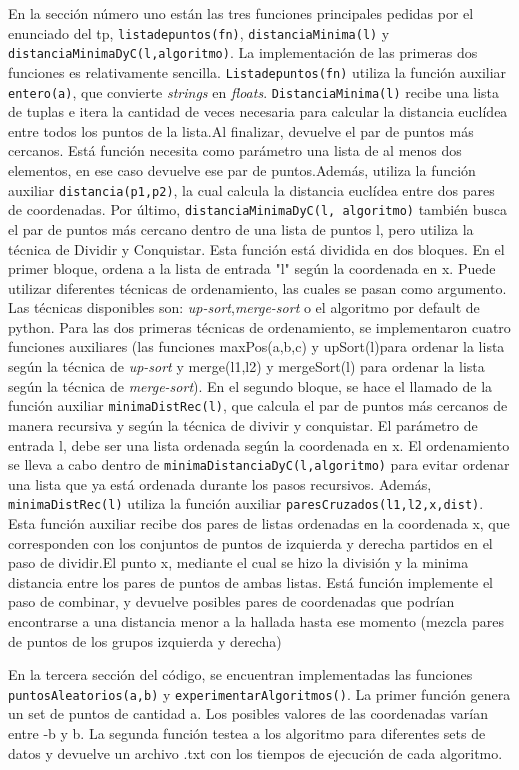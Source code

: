 \documentclass[12pt,a4paper]{article}
\begin{document}
En la sección número uno están las tres funciones principales pedidas por el enunciado del tp, \texttt{listadepuntos(fn)}, \texttt{distanciaMinima(l)} y \\\texttt{distanciaMinimaDyC(l,algoritmo)}. La implementación de las primeras dos funciones es relativamente sencilla. \texttt{Listadepuntos(fn)} utiliza la función auxiliar \texttt{entero(a)}, que convierte \textit{strings} en \textit{floats}. \texttt{DistanciaMinima(l)} recibe una lista de tuplas e itera la cantidad de veces necesaria para calcular la distancia euclídea entre todos los puntos de la lista.Al finalizar, devuelve el par de puntos más cercanos. Está función necesita como parámetro una lista de al menos dos elementos, en ese caso devuelve ese par de puntos.Además, utiliza la función auxiliar \texttt{distancia(p1,p2)}, la cual calcula la distancia euclídea entre dos pares de coordenadas. Por último, \texttt{distanciaMinimaDyC(l, algoritmo)} también busca el par de puntos más cercano dentro de una lista de puntos l, pero utiliza la técnica de Dividir y Conquistar. Esta función está dividida en dos bloques. En el primer bloque, ordena a la lista de entrada "l" según la coordenada en x. Puede utilizar diferentes técnicas de ordenamiento, las cuales se pasan como argumento. Las técnicas disponibles son: \textit{up-sort},\textit{merge-sort} o el algoritmo por default de python. Para las dos primeras técnicas de ordenamiento, se implementaron cuatro funciones auxiliares (las funciones maxPos(a,b,c) y upSort(l)para ordenar la lista según la técnica de \textit{up-sort} y  merge(l1,l2) y mergeSort(l) para ordenar la lista según la técnica de \textit{merge-sort}). En el segundo bloque, se hace el llamado de la función auxiliar \texttt{minimaDistRec(l)}, que calcula el par de puntos más cercanos de manera recursiva y según la técnica de divivir y conquistar. El parámetro de entrada l, debe ser una lista ordenada según la coordenada en x. El ordenamiento se lleva a cabo dentro de \texttt{minimaDistanciaDyC(l,algoritmo)} para evitar ordenar una lista que ya está ordenada durante los pasos recursivos. Además, \texttt{minimaDistRec(l)} utiliza la función auxiliar \texttt{paresCruzados(l1,l2,x,dist)}. Esta función auxiliar recibe dos pares de listas ordenadas en la coordenada x, que corresponden con los conjuntos de puntos de izquierda y derecha partidos en el paso de dividir.El punto x, mediante el cual se hizo la división y la minima distancia entre los pares de puntos de ambas listas. Está función implemente el paso de combinar, y devuelve posibles pares de coordenadas que podrían encontrarse a una distancia menor a la hallada hasta ese momento (mezcla pares de puntos de los grupos izquierda y derecha)\par 
En la tercera sección del código, se encuentran implementadas las funciones \texttt{puntosAleatorios(a,b)} y \texttt{experimentarAlgoritmos()}. La primer función genera un set de puntos de cantidad a. Los posibles valores de las coordenadas varían  entre -b y b. La segunda función testea a los algoritmo para diferentes sets de datos y devuelve un archivo .txt con los tiempos de ejecución de cada algoritmo. \par 
\end{document}
